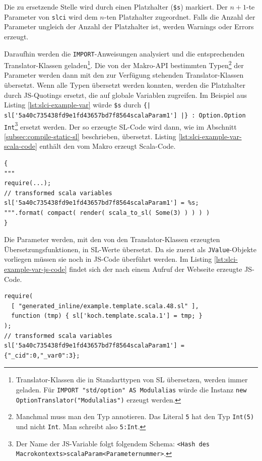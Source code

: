 \documentclass[12pt]{scrreprt}
\begin{document}
Die zu ersetzende Stelle wird durch einen Platzhalter (\lstinline!$s!) markiert. Der $n+1$-te Parameter von \lstinline!slci! wird dem $n$-ten Platzhalter zugeordnet. Falls die Anzahl der Parameter ungleich der Anzahl der Platzhalter ist, werden Warnings oder Errors erzeugt. 

Daraufhin werden die \lstinline!IMPORT!-Anweisungen analysiert und die entsprechenden Translator-Klassen geladen\footnote{Translator-Klassen die in Standarttypen von SL übersetzen, werden immer geladen. Für \lstinline!IMPORT "std/option" AS Modulalias! würde die Instanz \lstinline!new OptionTranslator("Modulalias")! erzeugt werden.}. Die von der Makro-API bestimmten Typen\footnote{Manchmal muss man den Typ annotieren. Das Literal \lstinline!5! hat den Typ \lstinline!Int(5)! und nicht \lstinline!Int!. Man schreibt also \lstinline!5:Int!.} der Parameter werden dann mit den zur Verfügung stehenden Translator-Klassen übersetzt. 
Wenn alle Typen übersetzt werden konnten, werden die Platzhalter durch \ac{JS}-Quotings ersetzt, die auf globale Variablen zugreifen. Im Beispiel aus Listing \ref{lst:slci-example-var} würde \lstinline!$s! durch \lstinline!{| sl['5a40c735438fd9e1fd43657bd7f8564scalaParam1'] |} : Option.Option Int!\footnote{Der Name der JS-Variable folgt folgendem Schema: \lstinline!<Hash des Macrokontexts>scalaParam<Parameternummer>!.} ersetzt werden. Der so erzeugte SL-Code wird dann, wie im Abschnitt \ref{subsec:compile-static-sl} beschrieben, übersetzt. 
Listing \ref{lst:slci-example-var-scala-code} enthält den vom Makro erzeugt Scala-Code. 

\begin{lstlisting}[caption={Erzeugter Scala-Code zum Listing \ref{lst:slci-example-var}}, label=lst:slci-example-var-scala-code, float=h]
{ 
"""
require(...);
// transformed scala variables    
sl['5a40c735438fd9e1fd43657bd7f8564scalaParam1'] = %s;
""".format( compact( render( scala_to_sl( Some(3) ) ) ) )
}
\end{lstlisting}

Die Parameter werden, mit den von den Translator-Klassen erzeugten Übersetzungsfunktionen, in \ac{SL}-Werte übersetzt. Da sie zuerst als \lstinline!JValue!-Objekte vorliegen müssen sie noch in \ac{JS}-Code überführt werden. Im Listing \ref{lst:slci-example-var-js-code} findet sich der nach einem Aufruf der Webseite erzeugte \ac{JS}-Code.

\begin{lstlisting}[caption={JS-Code zum Listing \ref{lst:slci-example-var}}, label=lst:slci-example-var-js-code, float=h]
require( 
  [ "generated_inline/example.template.scala.48.sl" ],
  function (tmp) { sl['koch.template.scala.1'] = tmp; }
);
// transformed scala variables 
sl['5a40c735438fd9e1fd43657bd7f8564scalaParam1'] = {"_cid":0,"_var0":3};
\end{lstlisting}
\end{document}
